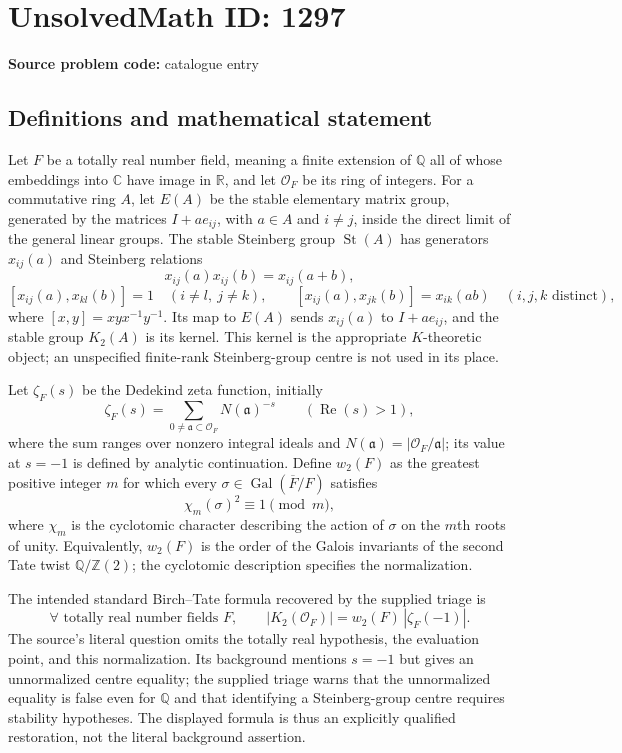\documentclass[11pt]{article}
\newcommand{\Z}{\mathbb{Z}}
\newcommand{\Q}{\mathbb{Q}}
\newcommand{\R}{\mathbb{R}}
\newcommand{\C}{\mathbb{C}}
\begin{document}
\section*{UnsolvedMath ID: 1297}
\textbf{Source problem code:} catalogue entry
\subsection{Definitions and mathematical statement}
Let $F$ be a totally real number field, meaning a finite extension of $\Q$ all of whose embeddings into $\C$ have image in $\R$, and let $\mathcal O_F$ be its ring of integers. For a commutative ring $A$, let $E(A)$ be the stable elementary matrix group, generated by the matrices $I+ae_{ij}$, with $a\in A$ and $i\ne j$, inside the direct limit of the general linear groups. The stable Steinberg group $\operatorname{St}(A)$ has generators $x_{ij}(a)$ and Steinberg relations
\[
x_{ij}(a)x_{ij}(b)=x_{ij}(a+b),
\]
\[
[x_{ij}(a),x_{kl}(b)]=1\quad(i\ne l,\ j\ne k),\qquad
[x_{ij}(a),x_{jk}(b)]=x_{ik}(ab)\quad(i,j,k\text{ distinct}),
\]
where $[x,y]=xyx^{-1}y^{-1}$. Its map to $E(A)$ sends $x_{ij}(a)$ to $I+ae_{ij}$, and the stable group $K_2(A)$ is its kernel. This kernel is the appropriate $K$-theoretic object; an unspecified finite-rank Steinberg-group centre is not used in its place.

Let $\zeta_F(s)$ be the Dedekind zeta function, initially
\[
\zeta_F(s)=\sum_{0\ne\mathfrak a\subset\mathcal O_F}N(\mathfrak a)^{-s}\qquad(\operatorname{Re}(s)>1),
\]
where the sum ranges over nonzero integral ideals and $N(\mathfrak a)=|\mathcal O_F/\mathfrak a|$; its value at $s=-1$ is defined by analytic continuation. Define $w_2(F)$ as the greatest positive integer $m$ for which every $\sigma\in\operatorname{Gal}(\overline F/F)$ satisfies
\[
\chi_m(\sigma)^2\equiv1\pmod m,
\]
where $\chi_m$ is the cyclotomic character describing the action of $\sigma$ on the $m$th roots of unity. Equivalently, $w_2(F)$ is the order of the Galois invariants of the second Tate twist $\Q/\Z(2)$; the cyclotomic description specifies the normalization.

The intended standard Birch--Tate formula recovered by the supplied triage is
\[
\forall\text{ totally real number fields }F,\qquad
|K_2(\mathcal O_F)|=w_2(F)\,|\zeta_F(-1)|.
\]
The source's literal question omits the totally real hypothesis, the evaluation point, and this normalization. Its background mentions $s=-1$ but gives an unnormalized centre equality; the supplied triage warns that the unnormalized equality is false even for $\Q$ and that identifying a Steinberg-group centre requires stability hypotheses. The displayed formula is thus an explicitly qualified restoration, not the literal background assertion.
\end{document}
